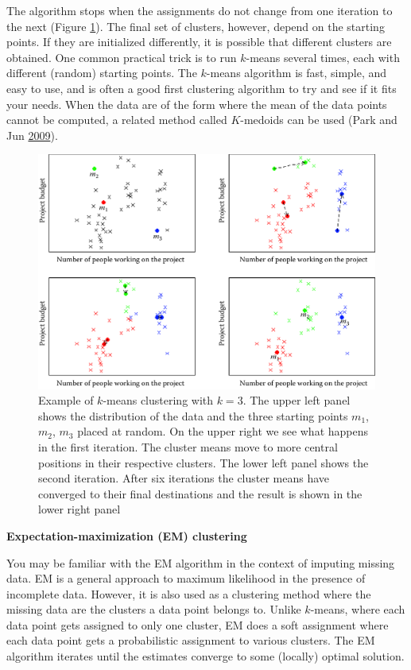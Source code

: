 \documentclass[]{krantz}
\begin{document}
The algorithm stops when the assignments do not change from one
iteration to the next (Figure \ref{fig:kmeans}). The final set of
clusters, however, depend on the starting points. If they are
initialized differently, it is possible that different clusters are
obtained. One common practical trick is to run \(k\)-means several
times, each with different (random) starting points. The \(k\)-means
algorithm is fast, simple, and easy to use, and is often a good first
clustering algorithm to try and see if it fits your needs. When the data
are of the form where the mean of the data points cannot be computed, a
related method called \(K\)-medoids can be used (Park and Jun
\protect\hyperlink{ref-park2009simple}{2009}).

\begin{figure}

{\centering \includegraphics[width=0.7\linewidth]{ChapterML/figures/kmeans} 

}

\caption{Example of $k$-means clustering with $k = 3$. The upper left panel shows the distribution of the data and the three starting points $m_1$, $m_2$, $m_3$ placed at random. On the upper right we see what happens in the first iteration. The cluster means move to more central positions in their respective clusters. The lower left panel shows the second iteration. After six iterations the cluster means have converged to their final destinations and the result is shown in the lower right panel}\label{fig:kmeans}
\end{figure}

\textbf{Expectation-maximization (EM) clustering}

\hspace*{3pt} You may be familiar with the EM algorithm in the context
of imputing missing data. EM is a general approach to maximum likelihood
in the presence of incomplete data. However, it is also used as a
clustering method where the missing data are the clusters a data point
belongs to. Unlike \(k\)-means, where each data point gets assigned to
only one cluster, EM does a soft assignment where each data point gets a
probabilistic assignment to various clusters. The EM algorithm iterates
until the estimates converge to some (locally) optimal solution.
\end{document}
